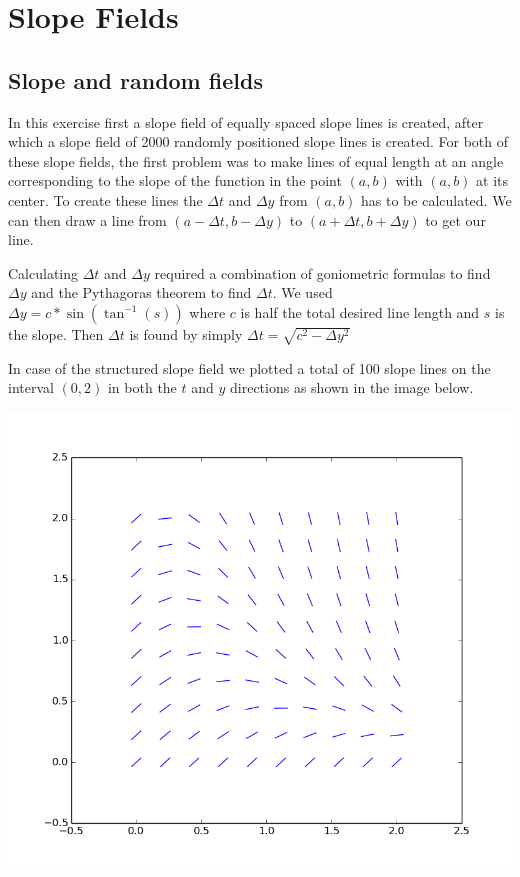 \documentclass[a4paper,12px]{article}
\begin{document}
\clearpage
\section{Slope Fields}
\subsection{Slope and random fields}

In this exercise first a slope field of equally spaced slope lines is created,
after which a slope field of 2000 randomly positioned slope lines is created.
For both of these slope fields, the first problem was to make lines of equal
length at an angle corresponding to the slope of the function in the point
$(a,b)$ with $(a,b)$ at its center. To create these lines the $\Delta t$ and
$\Delta y$ from $(a,b)$ has to be calculated. We can then draw a line from
$(a-\Delta t, b-\Delta y)$ to $(a+\Delta t, b+\Delta y)$ to get our line.

Calculating $\Delta t$ and $\Delta y$ required a combination of goniometric
formulas to find $\Delta y$ and the Pythagoras theorem to find $\Delta t$.  We
used $\Delta y = c*\sin(\tan^{-1}(s))$ where $c$ is half the total
desired line length and $s$ is the slope. Then $\Delta t$ is found by simply
$\Delta t= \sqrt{c^2-\Delta y^2}$

In case of the structured slope field we plotted a total of 100 slope lines on
the interval $(0,2)$ in both the $t$ and $y$ directions as shown in the image
below.
\begin{center}
    \includegraphics[width=\textwidth]{slopefield}
\end{center}
\end{document}

